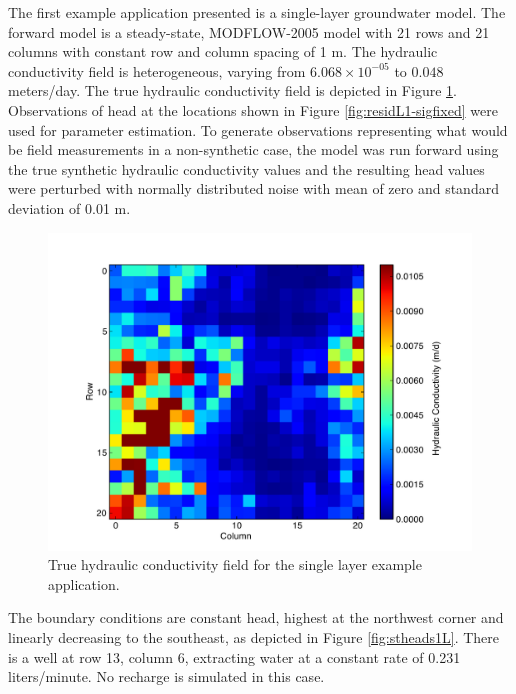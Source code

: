 \documentclass[11pt,oneside,onecolumn]{usgsreport}
\begin{document}
\begin{appendix}

The first example application presented is a single-layer groundwater
model. The forward model is a steady-state, MODFLOW-2005 model with
21 rows and 21 columns with constant row and column spacing of 1 m.
The hydraulic conductivity field is heterogeneous, varying from $6.068\times10^{-05}$
to $0.048$ meters/day. The true hydraulic conductivity field is depicted
in Figure \ref{fig:trueK1L}. Observations of head at the locations
shown in Figure \ref{fig:residL1-sigfixed} were used for parameter
estimation. To generate observations representing what would be field
measurements in a non-synthetic case, the model was run forward using
the true synthetic hydraulic conductivity values and the resulting
head values were perturbed with normally distributed noise with mean
of zero and standard deviation of 0.01 m.

\begin{figure}[!t]
\begin{center}\includegraphics[scale=0.4]{figures/TrueK}\end{center}

\caption{True hydraulic conductivity field for the single layer example application.\label{fig:trueK1L}}


\end{figure}
The boundary conditions are constant head, highest at the northwest
corner and linearly decreasing to the southeast, as depicted in Figure
\ref{fig:stheads1L}. There is a well at row 13, column 6, extracting
water at a constant rate of 0.231 liters/minute. No recharge is simulated
in this case.


\end{appendix}
\end{document}
